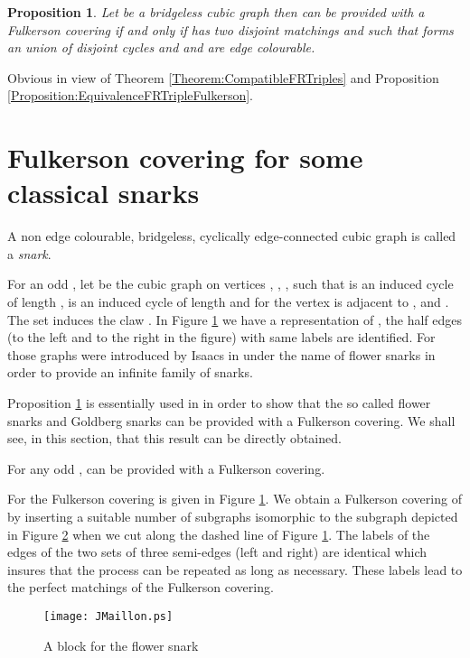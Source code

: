 \documentclass{amsart}
\newtheorem{prop}[thm]{Proposition}
\theoremstyle{definition}
\theoremstyle{remark}
\newenvironment{prf}{{\bf \noindent Proof } }{\hfill\\}
\begin{document}
\begin{prop}\cite{HaoNiuWanZhaZha2009}\label{Proposition:HaoNiuWanZhanZhan}
Let  be a bridgeless cubic graph then  can be provided with a
Fulkerson covering if and only if  has  two disjoint matchings
 and  such that  forms an union of disjoint cycles and  and
 are edge colourable.
\end{prop}
\begin{prf}
Obvious in view of Theorem \ref{Theorem:CompatibleFRTriples} and
Proposition \ref{Proposition:EquivalenceFRTripleFulkerson}.
\end{prf}

\section{Fulkerson covering for some classical snarks}
A non edge colourable, bridgeless, cyclically edge-connected
cubic graph is called a {\em snark}. 

For an odd , let  be the cubic graph on  vertices , , ,
 such that  is an
induced cycle of length ,   is an induced cycle of length  and for 
the vertex  is adjacent to ,  and . The set
 induces the claw . In Figure
\ref{Figure:J3} we have a representation of , the half edges
(to the left and to the right in the figure) with same labels are
identified.
For  those graphs were introduced by Isaacs in \cite{Isa75} under the name of flower snarks in order to provide an infinite family of snarks.

Proposition \ref{Proposition:HaoNiuWanZhanZhan} is essentially used in
\cite{HaoNiuWanZhaZha2009} in order to show that the so called
flower snarks and Goldberg snarks can be provided with a Fulkerson
covering. We shall see, in this section, that this result can be
directly obtained.
\begin{figure}
\centering {} \hsize \noindent {}
\caption{} \label{Figure:J3}
\end{figure}

\begin{thm}  \label{Theorem:FlowerSnark} For any odd ,  can be
provided with a Fulkerson covering.
\end{thm}
\begin{prf}
For  the Fulkerson covering is given in Figure \ref{Figure:J3}.
We obtain a Fulkerson covering of  by inserting a suitable
number of subgraphs isomorphic to the subgraph depicted in Figure
\ref{Figure:JMaillon} when we cut  along the dashed line of
Figure \ref{Figure:J3}. The labels of the edges of the two sets of
three semi-edges (left and right) are identical which insures that
the process can be repeated as long as necessary. These labels lead
to the perfect matchings of the Fulkerson covering.

\begin{figure}
\texttt{[image: JMaillon.ps]}
\caption{A block for the flower snark} \label{Figure:JMaillon}
\end{figure}
\end{prf}
\end{document}
